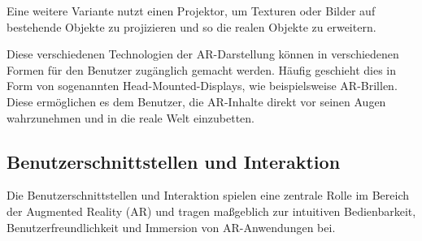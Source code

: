 Eine weitere Variante nutzt einen Projektor, um Texturen oder Bilder auf
bestehende Objekte zu projizieren und so die realen Objekte zu erweitern.

Diese verschiedenen Technologien der AR-Darstellung können in verschiedenen
Formen für den Benutzer zugänglich gemacht werden. Häufig geschieht dies in
Form von sogenannten Head-Mounted-Displays, wie beispielsweise AR-Brillen.
Diese ermöglichen es dem Benutzer, die AR-Inhalte direkt vor seinen Augen
wahrzunehmen und in die reale Welt einzubetten.

\subsection{Benutzerschnittstellen und Interaktion}
Die Benutzerschnittstellen und Interaktion spielen eine zentrale Rolle im
Bereich der Augmented Reality (AR) und tragen maßgeblich zur intuitiven
Bedienbarkeit, Benutzerfreundlichkeit und Immersion von AR-Anwendungen bei.

